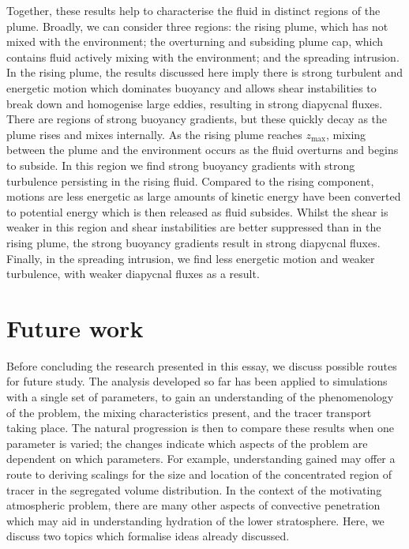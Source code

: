 \documentclass[a4paper]{article}
\begin{document}
Together, these results help to characterise the fluid in distinct regions of the plume. Broadly, we can
consider three regions: the rising plume, which has not mixed with the environment; the overturning and
subsiding plume cap, which contains fluid actively mixing with the environment; and the spreading intrusion.
In the rising plume, the results discussed here imply there is strong turbulent and energetic motion which
dominates buoyancy and allows shear instabilities to break down and homogenise large eddies, resulting in
strong diapycnal fluxes. There are regions of strong buoyancy gradients, but these quickly decay as the plume
rises and mixes internally. As the rising plume reaches $z_{\max}$, mixing between the plume and the
environment occurs as the fluid overturns and begins to subside. In this region we find strong buoyancy
gradients with strong turbulence persisting in the rising fluid. Compared to the rising component, motions are
less energetic as large amounts of kinetic energy have been converted to potential energy which is then
released as fluid subsides. Whilst the shear is weaker in this region and shear instabilities are better
suppressed than in the rising plume, the strong buoyancy gradients result in strong diapycnal fluxes.
Finally, in the spreading intrusion, we find less energetic motion and weaker turbulence, with weaker
diapycnal fluxes as a result.


\section{Future work}

Before concluding the research presented in this essay, we discuss possible routes for future study. The
analysis developed so far has been applied to simulations with a single set of parameters, to gain an
understanding of the phenomenology of the problem, the mixing characteristics present, and the tracer
transport taking place. The natural progression is then to compare these results when one parameter is
varied; the changes indicate which aspects of the problem are dependent on which parameters. For example,
understanding gained may offer a route to deriving scalings for the size and location of the concentrated
region of tracer in the segregated volume distribution. In the context of the motivating atmospheric problem,
there are many other aspects of convective penetration which may aid in understanding hydration of the
lower stratosphere. Here, we discuss two topics which formalise ideas already discussed. 
\end{document}
